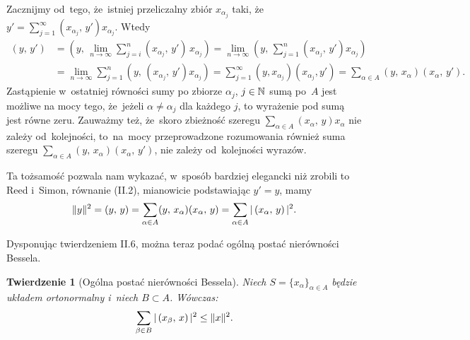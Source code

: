 \documentclass[a4paper,11pt]{article}
\newtheorem{theorem}{Twierdzenie} %
\begin{document}
Zacznijmy od~tego, że~istniej przeliczalny zbiór $x_{ \alpha_{ j } }$
taki,
że~$y' = \sum_{ j = 1 }^{ \infty } ( x_{ \alpha_{ j } }, \, y' ) x_{ \alpha_{ j } }$.
Wtedy
\begin{equation}
  \label{eq:RS-Vol-I-s01-23}
  \begin{split}
    ( y, \, y' )
    &=
      ( y, \, \lim_{ n \to \infty } \sum_{ j = i }^{ n }
      ( x_{ \alpha_{ j } }, \,  y' ) \, x_{ \alpha_{ j } } )
      =
      \lim_{ n \to \infty } ( y, \, \sum_{ j = 1 }^{ n }
      ( x_{ \alpha_{ j } }, \, y' ) x_{ \alpha_{ j } } ) \\
    &=
      \lim_{ n \to \infty } \sum_{ j = 1 }^{ n } ( y, \, ( x_{ \alpha_{ j } }, \, y' )
      x_{ \alpha_{ j } } )
      =
      \sum_{ j = 1 }^{ \infty } ( y, x_{ \alpha_{ j } } ) ( x_{ \alpha_{ j } }, y' )
      =
      \sum_{ \alpha \in A } ( y, \, x_{ \alpha } ) ( x_{ \alpha }, \,  y' ).
  \end{split}
\end{equation}
Zastąpienie w~ostatniej równości sumy po zbiorze
$\alpha_{ j }$, $j \in \mathbb{N}$ sumą po~$A$ jest możliwe na mocy tego,
że~jeżeli $\alpha \neq \alpha_{ j }$ dla każdego $j$, to wyrażenie pod
sumą jest równe zeru. Zauważmy też, że~skoro zbieżność szeregu
$\sum_{ \alpha \in A } ( x_{ \alpha }, \, y ) x_{ \alpha }$ nie zależy
od~kolejności, to~na~mocy przeprowadzone rozumowania również suma
szeregu
$\sum_{ \alpha \in A } ( y, \, x_{ \alpha } ) ( x_{ \alpha }, \, y' )$, nie
zależy od~kolejności wyrazów.

Ta tożsamość pozwala nam wykazać, w~sposób bardziej elegancki niż
zrobili to Reed i~Simon, równanie (II.2), mianowicie podstawiając
$y' = y$, mamy
\begin{equation}
  \label{eq:RS-Vol-I-s01-24}
  \lVert{  y  }\rVert^{ 2 } = ( y, \, y ) =
  \sum_{ \alpha \in A } ( y, \, x_{ \alpha } ) ( x_{ \alpha }, \, y )
  = \sum_{ \alpha \in A } |\, {  ( x_{ \alpha }, \,  y )  } \,|^{ 2 }.
\end{equation}

\vspace{\spaceFour}



\start {} Dysponując twierdzeniem II.6, można teraz podać ogólną
postać nierówności Bessela.




\begin{theorem}[Ogólna postać nierówności Bessela]

  Niech $S = \{ x_{ \alpha } \}_{ \alpha \in A }$ będzie układem
  ortonormalny i~niech $B \subset A$. Wówczas:
  \begin{equation}
    \label{eq:RS-Vol-I-s01-25}
    \sum_{ \beta \in B } |\, {  ( x_{ \beta }, \, x )  } \,|^{ 2 } \leq \lVert{  x  }\rVert^{ 2 }.
  \end{equation}

\end{theorem}
\end{document}
